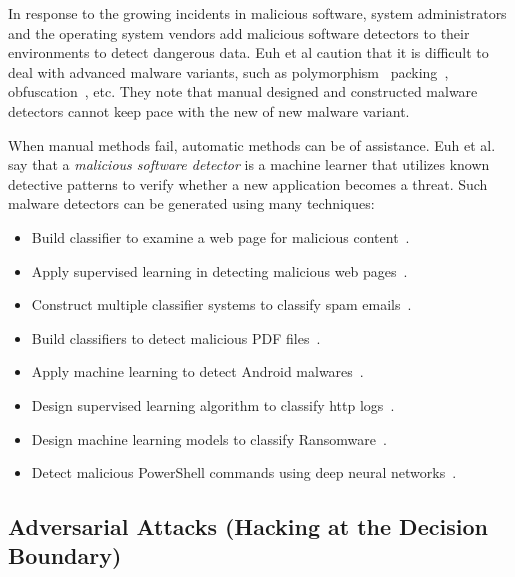 \documentclass{NSF}
\newenvironment{myitemize}
{ \begin{itemize}[topsep=0pt,bottomsep=0pt,itemsep=0,leftmargin=*]
    \setlength{\itemsep}{0pt}
    \setlength{\parskip}{0pt}
    \setlength{\parsep}{0pt}     }
{ \end{itemize}                  }
\newcommand{\bi}{\begin{myitemize}}
\newcommand{\ei}{\end{myitemize}}
\begin{document}
\begin{nsfdescription}
   
  
 
In response to the growing incidents in malicious software, system administrators and the operating system vendors add malicious software detectors to their environments to detect dangerous data. Euh et al  caution that  it is difficult to deal with advanced malware variants, such as polymorphism~\cite{sikorsi2012practical,alazab2015profiling} packing~\cite{roundy2013binary}, obfuscation~\cite{murad2010evading}, etc. They note that manual designed and constructed malware detectors cannot keep pace with the new of new malware variant.
  
When manual methods fail, automatic methods can be of assistance. Euh et al. say that a {\em  malicious software detector} is a machine learner that utilizes known detective patterns to verify whether a new application becomes a threat. Such malware detectors can be generated using many techniques:
\bi
\item 
Build classifier to examine a web page for malicious content~\cite{canali2011prophiler}.
\item 
Apply supervised learning in detecting malicious web pages~\cite{eshete2012binspect}.
\item 
Construct multiple classifier systems to classify spam emails~\cite{biggio2010multiple}.
\item 
Build classifiers to detect malicious PDF files~\cite{xu2016automatically}.
\item 
Apply machine learning to detect Android malwares~\cite{grosse2017adversarial}.
\item 
Design supervised learning algorithm to classify http logs~\cite{liu2017robust}.
\item 
Design machine learning models to classify Ransomware~\cite{munoz2017towards}.
\item 
Detect malicious PowerShell commands using deep neural networks~\cite{hendler2018detecting}.
\ei
 
% 

\subsection{ Adversarial Attacks (Hacking at the Decision Boundary)}


  
 

\end{nsfdescription}
\end{document}
